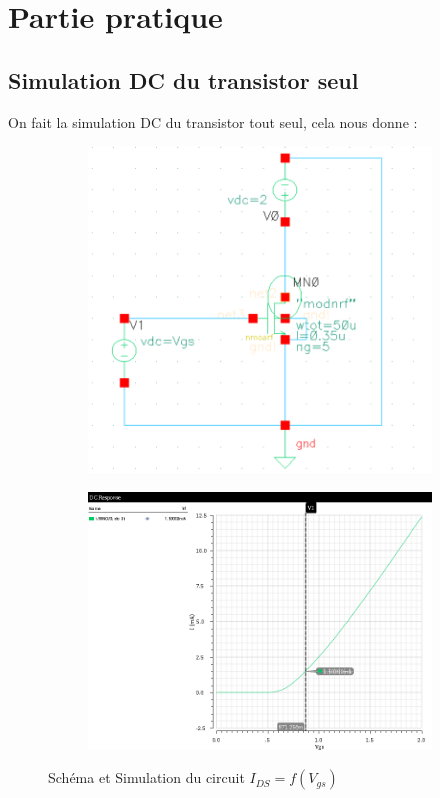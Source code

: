 \documentclass[a4paper]{article}
\begin{document}
\section{Partie pratique}
\subsection{Simulation DC du transistor seul}

On fait la simulation DC du transistor tout seul, cela nous donne :

\begin{figure}[!htb]
  \begin{subfigure}[t]{.4\linewidth}
      \centering
      \includegraphics[width=\linewidth]{Q1-schematic.png}
      \label{fig:dctransistor}
  \end{subfigure}%
  \begin{subfigure}[t]{.6\linewidth}
    \centering
    \includegraphics[width=\linewidth]{Q1-IDS_VGS.png}
    \label{fig:dctransistor-sim}
  \end{subfigure}%
  \caption{Sch\'ema et Simulation du circuit $I_{DS} = f(V_{gs})$}
  \label{fig:DCtransistor-simulation}
\end{figure}
\end{document}
